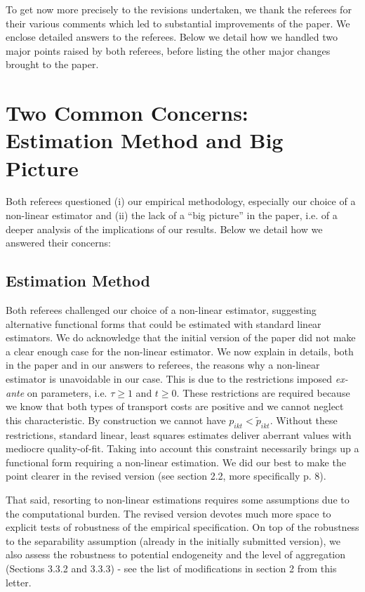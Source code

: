 \documentclass[12pt]{article}
\begin{document}
To get now more precisely to the revisions undertaken, we thank the referees for their various comments which led to substantial improvements of the paper. We enclose detailed answers to the referees. Below we detail how we handled two major points raised by both referees, before listing the other major changes brought to the paper.

\section{Two Common Concerns: Estimation Method and Big Picture}
Both referees questioned (i) our empirical methodology, especially our choice of a non-linear estimator and (ii) the lack of a ``big picture'' in the paper, i.e. of a deeper analysis of the implications of our results. Below we detail how we answered their concerns:\medskip

\subsection{Estimation Method}
Both referees challenged our choice of a non-linear estimator, suggesting alternative functional forms that could be estimated with standard linear estimators. We do acknowledge that the initial version of the paper did not make a clear enough case for the non-linear estimator. We now explain in details, both in the paper and in our answers to referees, the reasons why a non-linear estimator is unavoidable in our case. This is due to the restrictions imposed \textit{ex-ante} on parameters, i.e. $\tau \geq 1$ and $t\geq 0$. These restrictions are required because we know that both types of transport costs are positive and we cannot neglect this characteristic. By construction we cannot have $p_{ikt} < \widetilde{p}_{ikt}$. Without these restrictions, standard linear, least squares estimates deliver aberrant values with mediocre quality-of-fit. Taking into account this constraint necessarily brings up a functional form requiring a non-linear estimation. We did our best to make the point clearer in the revised version (see section 2.2, more specifically p. 8). \medskip

That said, resorting to non-linear estimations requires some assumptions due to the computational burden. The revised version devotes much more space to explicit tests of robustness of the empirical specification. On top of the robustness to the separability assumption (already in the initially submitted version), we also assess the robustness to potential endogeneity and the level of aggregation (Sections 3.3.2 and 3.3.3) - see the list of modifications in section 2 from this letter. \medskip
\end{document}
